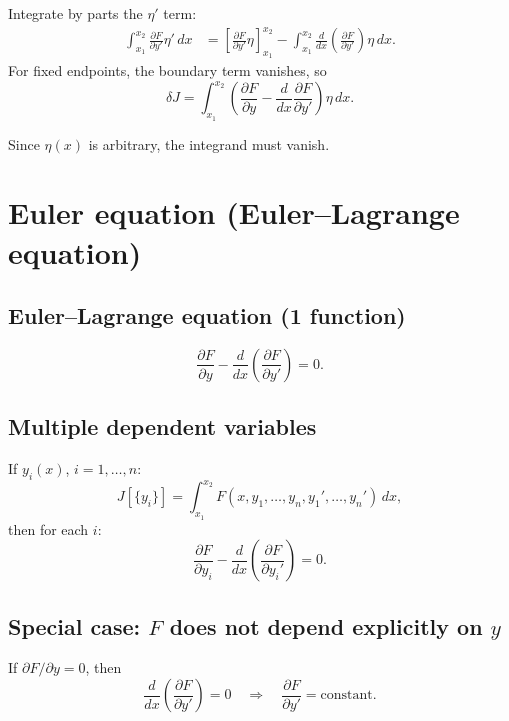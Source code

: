 Integrate by parts the $\eta'$ term:
\begin{align}
\int_{x_1}^{x_2}\frac{\partial F}{\partial y'}\eta'\,dx
&=
\left[\frac{\partial F}{\partial y'}\eta\right]_{x_1}^{x_2}
-\int_{x_1}^{x_2}\frac{d}{dx}\left(\frac{\partial F}{\partial y'}\right)\eta\,dx.
\end{align}
For fixed endpoints, the boundary term vanishes, so
\begin{equation}
\delta J
=
\int_{x_1}^{x_2}
\left(
\frac{\partial F}{\partial y}
-
\frac{d}{dx}\frac{\partial F}{\partial y'}
\right)\eta\,dx.
\end{equation}

Since $\eta(x)$ is arbitrary, the integrand must vanish.


\section{Euler equation (Euler--Lagrange equation)}

\subsection{Euler--Lagrange equation (1 function)}
\begin{equation}
\boxed{
\frac{\partial F}{\partial y}
-
\frac{d}{dx}\left(\frac{\partial F}{\partial y'}\right)=0.
}
\end{equation}

\subsection{Multiple dependent variables}
If $y_i(x)$, $i=1,\dots,n$:
\begin{equation}
J[\{y_i\}] = \int_{x_1}^{x_2} F(x, y_1,\dots,y_n, y_1',\dots,y_n')\,dx,
\end{equation}
then for each $i$:
\begin{equation}
\boxed{
\frac{\partial F}{\partial y_i}
-
\frac{d}{dx}\left(\frac{\partial F}{\partial y_i'}\right)=0.
}
\end{equation}

\subsection{Special case: $F$ does not depend explicitly on $y$}
If $\partial F/\partial y = 0$, then
\begin{equation}
\frac{d}{dx}\left(\frac{\partial F}{\partial y'}\right)=0
\quad\Rightarrow\quad
\frac{\partial F}{\partial y'}=\text{constant}.
\end{equation}

